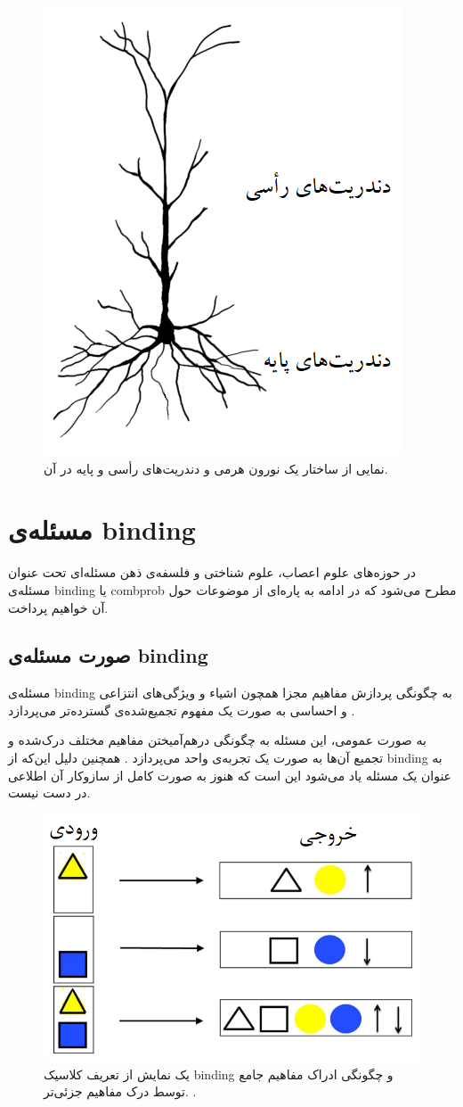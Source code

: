 \documentclass[12pt]{report}
\begin{document}
	\begin{figure}[H]
		\centering
		\includegraphics[width=0.5\linewidth]{pyramidal.png}
		\caption[NS]{
			نمایی از ساختار یک نورون هرمی و دندریت‌های رأسی و پایه در آن.
		}
		\label{fig:pyramidal}
	\end{figure}
	
	\section{مسئله‌ی \gls{binding}}
	
	در حوزه‌های علوم اعصاب، علوم شناختی و فلسفه‌ی ذهن مسئله‌ای تحت عنوان مسئله‌ی \gls{binding}
	یا \gls{combprob}
	مطرح می‌شود که در ادامه به پاره‌ای از موضوعات حول آن خواهیم پرداخت.
	
	\subsection{صورت مسئله‌ی \gls{binding}}
	
	مسئله‌ی \gls{binding} به چگونگی پردازش مفاهیم مجزا همچون اشیاء و ویژگی‌های انتزاعی و احساسی به صورت یک مفهوم تجمیع‌شده‌ی گسترده‌تر می‌پردازد
	\cite{REVONSUO1999123}.
	
	به صورت عمومی، این مسئله به چگونگی در‌هم‌آمیختن مفاهیم مختلف درک‌شده و تجمیع آن‌ها به صورت یک تجربه‌ی واحد می‌پردازد
	\cite{Feldman2012}.
	همچنین دلیل این‌که از \gls{binding} به عنوان یک مسئله یاد می‌شود این است که هنوز به صورت کامل از سازوکار آن اطلاعی در دست نیست.
	
	\begin{figure}[H]
		\centering
		\includegraphics[width=0.7\linewidth]{binding.png}
		\caption[NS]{
			یک نمایش از تعریف کلاسیک \gls{binding} و چگونگی ادراک مفاهیم جامع توسط درک مفاهیم جزئی‌تر.
			\cite{velic2012}.
		}
		\label{fig:binding}
	\end{figure}
	
\end{document}
